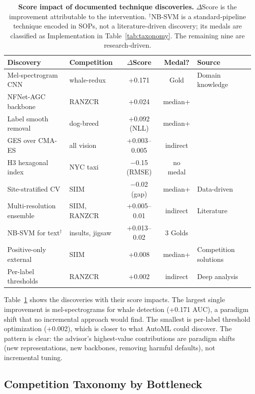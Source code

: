 \documentclass{article}
\begin{document}
\begin{table}[t]
\centering
\caption{\textbf{Score impact of documented technique discoveries.} $\Delta$Score is the improvement attributable to the intervention. $^\dagger$NB-SVM is a standard-pipeline technique encoded in SOPs, not a literature-driven discovery; its medals are classified as Implementation in Table~\ref{tab:taxonomy}. The remaining nine are research-driven.}
\label{tab:discoveries}
\small
\begin{tabular}{llccl}
\toprule
\textbf{Discovery} & \textbf{Competition} & \textbf{$\Delta$Score} & \textbf{Medal?} & \textbf{Source} \\
\midrule
Mel-spectrogram CNN & whale-redux & +0.171 & Gold & Domain knowledge \\
NFNet-AGC backbone & RANZCR & +0.024 & median+ & \citet{brock2021nfnet} \\
Label smooth removal & dog-breed & +0.092 (NLL) & median+ & \citet{labelsmoothing2025} \\
GES over CMA-ES & all vision & +0.003--0.005 & indirect & \citet{caruana2004ensemble} \\
H3 hexagonal index & NYC taxi & $-$0.15 (RMSE) & no medal & \citet{brodsky2018h3} \\
Site-stratified CV & SIIM & $-$0.02 (gap) & median+ & Data-driven \\
Multi-resolution ensemble & SIIM, RANZCR & +0.005--0.01 & indirect & Literature \\
NB-SVM for text$^\dagger$ & insults, jigsaw & +0.013--0.02 & 3 Golds & \citet{wang2012nbsvm} \\
Positive-only external & SIIM & +0.008 & median+ & Competition solutions \\
Per-label thresholds & RANZCR & +0.002 & indirect & Deep analysis \\
\bottomrule
\end{tabular}
\end{table}

Table~\ref{tab:discoveries} shows the discoveries with their score impacts. The largest single improvement is mel-spectrograms for whale detection (+0.171 AUC), a paradigm shift that no incremental approach would find. The smallest is per-label threshold optimization (+0.002), which is closer to what AutoML could discover. The pattern is clear: the advisor's highest-value contributions are paradigm shifts (new representations, new backbones, removing harmful defaults), not incremental tuning.

\subsection{Competition Taxonomy by Bottleneck}
\end{document}
